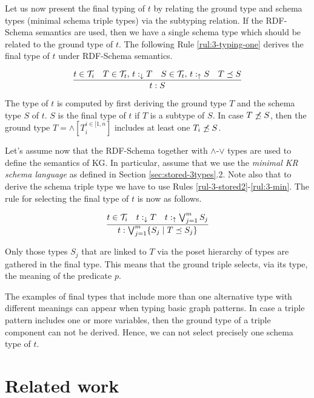 \documentclass[runningheads]{llncs}
\newcommand{\darr}{\downarrow}
\newcommand{\uarr}{\uparrow}
\newcommand{\T}{{\cal T}}
\begin{document}
Let us now present the final typing of $t$ by relating the ground type and
schema types (minimal schema triple types) via the subtyping relation. If
the RDF-Schema semantics are used, then we have a single schema type
which should be related to the ground type of $t$. The following Rule
\ref{rul:3-typing-one} derives the final type of $t$ under RDF-Schema
semantics. 

\begin{equation}
\label{rul:3-typing-one}
\dfrac{t\in\T_i\quad T\in\T_t,\, t:_{\darr}T\quad S\in\T_t,\, t:_\uarr\/S\quad T\preceq\/S}
      {t:S}
\end{equation}

The type of $t$ is computed by first deriving the ground type $T$ and
the schema type $S$ of $t$. $S$ is the final type of $t$ if $T$ is a
subtype of $S$. In case $T\not\preceq\/S$, then the ground type
$T=\land[T_i^{i\in[1,n}]$ includes at least one $T_i\not\preceq\/S$.

Let's assume now that the RDF-Schema together with $\land$-$\lor$ types are used to define the semantics of KG. In particular, assume that
we use the \emph{minimal KR schema language} as defined in Section
\ref{sec:stored-3types}.2. Note also that to derive the schema triple
type we have to use Rules \ref{rul-3-stored2}-\ref{rul:3-min}. The
rule for selecting the final type of $t$ is now as follows.

\begin{equation}
\label{rul:3-typing-two}
\dfrac{t\in\T_i\quad t:_{\darr}T\quad\/t:_\uarr\bigvee_{j=1}^{m}\/S_j}
      {t:\bigvee_{j=1}^m\{S_j \mid T\preceq\/S_j\}}
\end{equation}

Only those types $S_j$ that are linked to $T$ via the poset hierarchy
of types are gathered in the final type. This means that the ground
triple selects, via its type, the meaning of the predicate $p$.

The examples of final types that include more than one alternative
type with different meanings can appear when typing basic graph
patterns. In case a triple pattern includes one or more variables,
then the ground type of a triple component can not be
derived. Hence, we can not select precisely one schema type of $t$.






\section{Related work\label{sec:related}}
\end{document}
